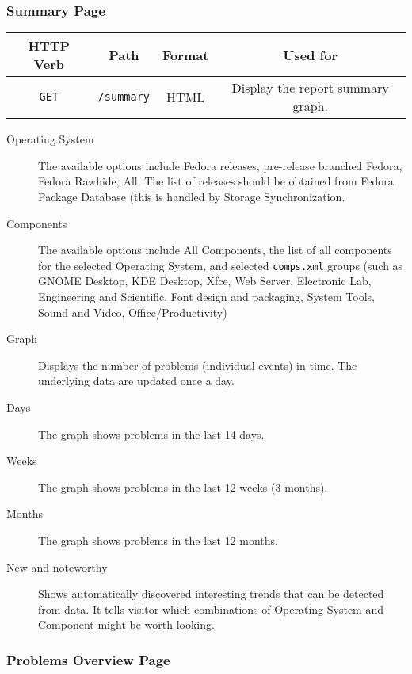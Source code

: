 \documentclass{article}
\begin{document}
\subsubsection{Summary Page}

\begin{center}
\begin{tabular}{|c|c|c|c|}
\hline
HTTP Verb & Path & Format & Used for \\
\hline
\texttt{GET} & \texttt{/summary} & HTML & Display the report summary graph. \\
\hline
\end{tabular}
\end{center}


\begin{center}
\end{center}

\begin{description}
\item[Operating System] The available options include Fedora releases,
  pre-release branched Fedora, Fedora Rawhide, All. The list of
  releases should be obtained from Fedora Package Database (this is
  handled by Storage Synchronization.
\item[Components] The available options include All Components, the
  list of all components for the selected Operating System, and
  selected \texttt{comps.xml} groups (such as GNOME Desktop, KDE
  Desktop, Xfce, Web Server, Electronic Lab, Engineering and
  Scientific, Font design and packaging, System Tools, Sound and
  Video, Office/Productivity)
\item[Graph] Displays the number of problems (individual events) in
  time. The underlying data are updated once a day.
\item[Days] The graph shows problems in the last 14 days.
\item[Weeks] The graph shows problems in the last 12 weeks (3 months).
\item[Months] The graph shows problems in the last 12 months.
\item[New and noteworthy] Shows automatically discovered interesting
  trends that can be detected from data.  It tells visitor which
  combinations of Operating System and Component might be worth
  looking.
\end{description}

\subsubsection{Problems Overview Page}
\end{document}
